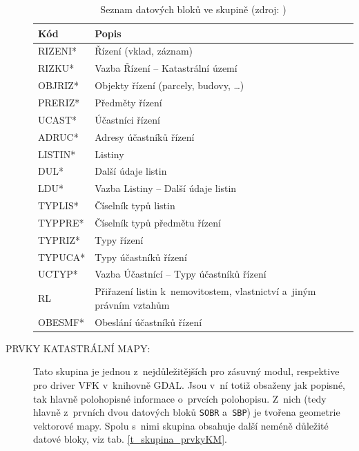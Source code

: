 \documentclass[a4paper,12pt,oneside]{book}
\begin{document}
\begin{description}
\begin{table}[htbp]
\centering
\caption[Seznam datových bloků ve skupině ]{Seznam datových bloků ve skupině  (zdroj: \cite{vfk_struktura})}
\begin{tabular}{ll}
\toprule
\textbf{Kód} & \textbf{Popis} \\ 
\midrule
RIZENI* & Řízení (vklad, záznam) \\ 
RIZKU* & Vazba Řízení -- Katastrální území \\ 
OBJRIZ* & Objekty řízení (parcely, budovy, \dots) \\ 
PRERIZ* & Předměty řízení \\ 
UCAST* & Účastníci řízení \\ 
ADRUC* & Adresy účastníků řízení \\ 
LISTIN* & Listiny \\ 
DUL* & Další údaje listin \\ 
LDU* & Vazba Listiny -- Další údaje listin \\ 
TYPLIS* & Číselník typů listin \\ 
TYPPRE* & Číselník typů předmětu řízení \\ 
TYPRIZ* & Typy řízení \\ 
TYPUCA* & Typy účastníků řízení \\ 
UCTYP* & Vazba Účastnící -- Typy účastníků řízení \\ 
RL & Přiřazení listin k~nemovitostem, vlastnictví a~jiným právním vztahům \\ 
OBESMF* & Obeslání účastníků řízení \\ 
\bottomrule
\end{tabular}
\label{t_skupina_rizeni}
\end{table}
 

\newpage
\item[PRVKY KATASTRÁLNÍ MAPY:] Tato skupina je jednou
  z~nejdůležitějších pro zásuvný modul, respektive pro driver VFK
  v~knihovně GDAL. Jsou v~ní totiž obsaženy jak popisné, tak hlavně
  polohopisné informace o~prvcích polohopisu. Z~nich (tedy hlavně
  z~prvních dvou datových bloků \texttt{SOBR} a~\texttt{SBP}) je
  tvořena geometrie vektorové mapy. Spolu s~nimi skupina obsahuje
  další neméně důležité datové bloky, viz
  tab. \ref{t_skupina_prvkyKM}. \cite{dp_landa}


\end{description}
\end{document}
